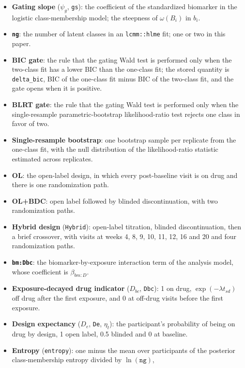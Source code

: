 \documentclass[
  11pt,
]{article}
\providecommand{\tightlist}{%
  \setlength{\itemsep}{0pt}\setlength{\parskip}{0pt}}
\begin{document}
\begin{itemize}
\tightlist
\item
  \textbf{Gating slope} (\(\psi_g\), \texttt{gs}): the coefficient of the
  standardized biomarker in the logistic class-membership model; the
  steepness of \(\omega(B_i)\) in \(b_i\).
\item
  \textbf{\texttt{ng}}: the number of latent classes in an \texttt{lcmm::hlme} fit; one
  or two in this paper.
\item
  \textbf{BIC gate}: the rule that the gating Wald test is performed only
  when the two-class fit has a lower BIC than the one-class fit; the
  stored quantity is \texttt{delta\_bic}, BIC of the one-class fit minus BIC
  of the two-class fit, and the gate opens when it is positive.
\item
  \textbf{BLRT gate}: the rule that the gating Wald test is performed only
  when the single-resample parametric-bootstrap likelihood-ratio test
  rejects one class in favor of two.
\item
  \textbf{Single-resample bootstrap}: one bootstrap sample per replicate
  from the one-class fit, with the null distribution of the
  likelihood-ratio statistic estimated across replicates.
\item
  \textbf{OL}: the open-label design, in which every post-baseline visit
  is on drug and there is one randomization path.
\item
  \textbf{OL+BDC}: open label followed by blinded discontinuation, with
  two randomization paths.
\item
  \textbf{Hybrid design} (\texttt{Hybrid}): open-label titration, blinded
  discontinuation, then a brief crossover, with visits at weeks 4, 8,
  9, 10, 11, 12, 16 and 20 and four randomization paths.
\item
  \textbf{\texttt{bm:Dbc}}: the biomarker-by-exposure interaction term of the
  analysis model, whose coefficient is \(\beta_{bm:D}\).
\item
  \textbf{Exposure-decayed drug indicator} (\(D_{bc}\), \texttt{Dbc}): 1 on drug,
  \(\exp(-\lambda t_{sd})\) off drug after the first exposure, and 0 at
  off-drug visits before the first exposure.
\item
  \textbf{Design expectancy} (\(D_e\), \texttt{De}, \(\eta_t\)): the participant's
  probability of being on drug by design, 1 open label, 0.5 blinded
  and 0 at baseline.
\item
  \textbf{Entropy} (\texttt{entropy}): one minus the mean over participants of
  the posterior class-membership entropy divided by \(\ln(\texttt{ng})\),

\end{itemize}
\end{document}
